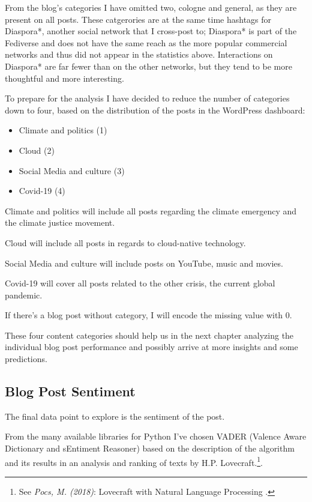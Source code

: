 From the blog's categories I have omitted two, cologne and general, as they are present on all posts. These catgerories are at the same time hashtags for Diaspora*, another social network that I cross-post to; Diaspora* is part of the Fediverse and does not have the same reach as the more popular commercial networks and thus did not appear in the statistics above. Interactions on Diaspora* are far fewer than on the other networks, but they tend to be more thoughtful and more interesting.

To prepare for the analysis I have decided to reduce the number of categories down to four, based on the distribution of the posts in the WordPress dashboard:

\begin{itemize}
\item Climate and politics (1)
\item Cloud (2)
\item Social Media and culture (3)
\item Covid-19 (4)
\end{itemize}

Climate and politics will include all posts regarding the climate emergency and the climate justice movement.

Cloud will include all posts in regards to cloud-native technology.

Social Media and culture will include posts on YouTube, music and movies.

Covid-19 will cover all posts related to the other crisis, the current global pandemic.

 If there's a blog post without category, I will encode the missing value with 0.

These four content categories should help us in the next chapter analyzing the individual blog post performance and possibly arrive at more insights and some predictions.

\subsection{Blog Post Sentiment}

The final data point to explore is the sentiment of the post.

From the many available libraries for Python I've chosen VADER (Valence Aware Dictionary and sEntiment Reasoner) based on the description of the algorithm and its results in an analysis and ranking of texts by H.P. Lovecraft.\footnote{See \textit{Pocs, M. (2018)}: Lovecraft with Natural Language Processing .\cite{lovecraftAnalysis}}.

